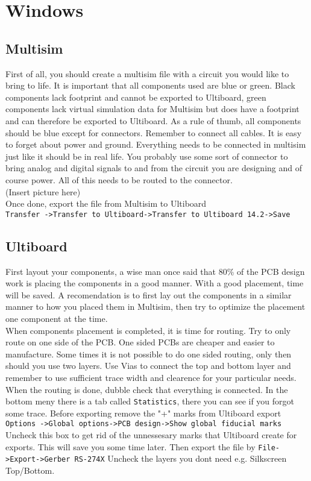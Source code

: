 \section{Windows}%
\label{sec:windows}
 \subsection{Multisim}
 First of all, you should create a multisim file with a circuit you would like to bring to life. It is important that all components used are blue or green. Black components lack footprint and cannot be exported to Ultiboard, green components lack virtual simulation data for Multisim but does have a footprint and can therefore be exported to Ultiboard. As a rule of thumb, all components should be blue except for connectors. Remember to connect all cables. It is easy to forget about power and ground. Everything needs to be connected in multisim just like it should be in real life. You probably use some sort of connector to bring analog and digital signals to and from the circuit you are designing and of course power. All of this needs to be routed to the connector.\\
 
 (Insert picture here)\\
Once done, export the file from Multisim to Ultiboard\\
\verb|Transfer ->Transfer to Ultiboard->Transfer to Ultiboard 14.2->Save|\\
 
\subsection{Ultiboard}
First layout your components, a wise man once said that 80\% of the PCB design work is placing the components in a good manner. With a good placement, time will be saved. A recomendation is to first lay out the components in a similar manner to how you placed them in Multisim, then try to optimize the placement one component at the time.\\
When components placement is completed, it is time for routing. Try to only route on one side of the PCB. One sided PCBs are cheaper and easier to manufacture. Some times it is not possible to do one sided routing, only then should you use two layers. Use Vias to connect the top and bottom layer and remember to use sufficient trace width and clearence for your particular needs. When the routing is done, dubble check that everything is connected. In the bottom meny there is a tab called \verb|Statistics|, there you can see if you forgot some trace. Before exporting remove the "+" marks from Ultiboard export\\
\verb|Options ->Global options->PCB design->Show global fiducial marks|\\
Uncheck this box to get rid of the unnessesary marks that Ultiboard create for exports. This will save you some time later.
Then export the file by
\verb|File->Export->Gerber RS-274X|
Uncheck the layers you dont need e.g. Silkscreen Top/Bottom.

